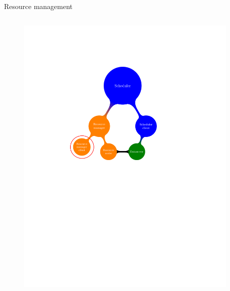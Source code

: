 \documentclass{beamer}
\begin{document}
\begin{frame}{Resource management}
\begin{columns}
\begin{column}[l]{0.5\linewidth}
{\begin{figure}
            \includegraphics[trim=5.5cm 14.3cm 2cm 6.3cm,scale=0.69]{rmc.pdf}
        \end{figure}
        }
	\end{column}
	\begin{column}[r]{0.5\linewidth}
        

\end{column}
\end{columns}
\end{frame}
\end{document}
